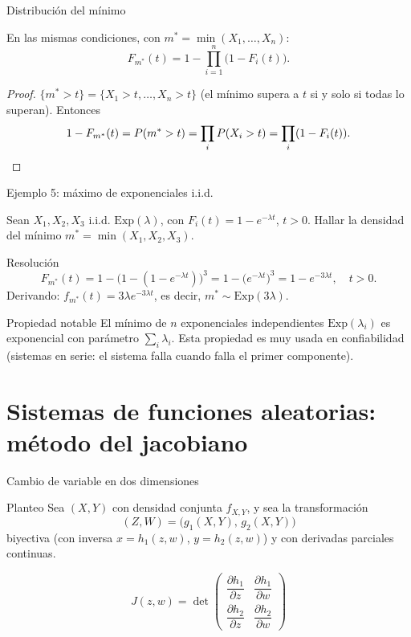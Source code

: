 \documentclass[aspectratio=169,11pt]{beamer}
\begin{document}
\begin{frame}{Distribución del mínimo}
\begin{theorem}
En las mismas condiciones, con $m^* = \min(X_1,\ldots,X_n)$:
\[
F_{m^*}(t) = 1 - \prod_{i=1}^n \big(1-F_i(t)\big).
\]
\end{theorem}
\begin{proof}
$\{m^* > t\} = \{X_1>t,\ldots,X_n>t\}$ (el mínimo supera a $t$ si y solo si todas lo superan). Entonces
\[
1-F_{m^*}(t) = P(m^*>t) = \prod_i P(X_i>t) = \prod_i (1-F_i(t)). \qedhere
\]
\end{proof}
\end{frame}

\begin{frame}{Ejemplo 5: máximo de exponenciales i.i.d.}
\begin{example}
Sean $X_1,X_2,X_3$ i.i.d. $\text{Exp}(\lambda)$, con $F_i(t) = 1-e^{-\lambda t}$, $t>0$. Hallar la densidad del mínimo $m^*=\min(X_1,X_2,X_3)$.
\end{example}
\pause
\begin{block}{Resolución}
\[
F_{m^*}(t) = 1-\big(1-(1-e^{-\lambda t})\big)^3 = 1-\big(e^{-\lambda t}\big)^3 = 1-e^{-3\lambda t}, \quad t>0.
\]
Derivando: $f_{m^*}(t) = 3\lambda e^{-3\lambda t}$, es decir, $m^* \sim \text{Exp}(3\lambda)$.
\end{block}
\begin{alertblock}{Propiedad notable}
El mínimo de $n$ exponenciales independientes $\text{Exp}(\lambda_i)$ es exponencial con parámetro $\sum_i \lambda_i$. Esta propiedad es muy usada en confiabilidad (sistemas en serie: el sistema falla cuando falla el primer componente).
\end{alertblock}
\end{frame}

\section{Sistemas de funciones aleatorias: método del jacobiano}

\begin{frame}{Cambio de variable en dos dimensiones}
\begin{block}{Planteo}
Sea $(X,Y)$ con densidad conjunta $f_{X,Y}$, y sea la transformación
\[
(Z,W) = \big(g_1(X,Y),\, g_2(X,Y)\big)
\]
biyectiva (con inversa $x=h_1(z,w)$, $y=h_2(z,w)$) y con derivadas parciales continuas.
\end{block}
\begin{definition}[Jacobiano]
\[
J(z,w) = \det \begin{pmatrix} \dfrac{\partial h_1}{\partial z} & \dfrac{\partial h_1}{\partial w} \\[2mm] \dfrac{\partial h_2}{\partial z} & \dfrac{\partial h_2}{\partial w} \end{pmatrix}
\]
\end{definition}
\end{frame}
\end{document}
